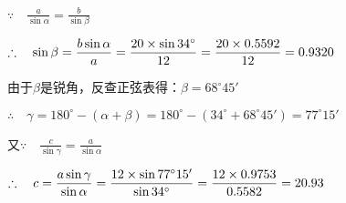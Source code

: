 \begin{solution}
$\because\quad \frac{a}{\sin\alpha}=\frac{b}{\sin\beta}$

$\therefore\quad \sin\beta=\dfrac{b\sin\alpha}{a}=\dfrac{20\times \sin 34^{\circ}}{12}=\dfrac{20\times 0.5592}{12}=0.9320$

由于$\beta$是锐角，反查正弦表得：$\beta=68^{\circ}45'$

$\therefore\quad \gamma=180^{\circ}-(\alpha+\beta)=180^{\circ}-(34^{\circ}+68^{\circ}45')=77^{\circ}15'$

又$\because\quad \frac{c}{\sin\gamma}=\frac{a}{\sin\alpha}$

$\therefore\quad c=\dfrac{a\sin\gamma}{\sin\alpha}=\dfrac{12\times \sin 77^{\circ}15'}{\sin 34^{\circ}}=\dfrac{12\times 0.9753}{0.5582}=20.93$
\end{solution}

